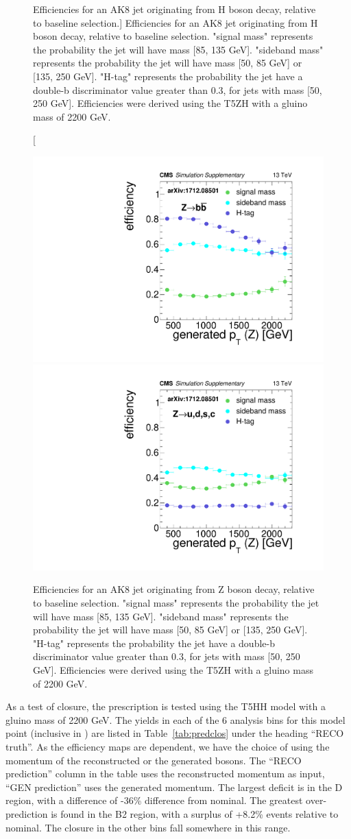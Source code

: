 \begin{figure}
\caption
[Efficiencies for an AK8 jet originating from H boson decay, relative to baseline selection.]
{Efficiencies for an AK8 jet originating from H boson decay, relative to baseline selection. "signal mass" represents the probability the jet will have mass [85, 135 GeV]. "sideband mass" represents the probability the jet will have mass [50, 85 GeV] or [135, 250 GeV]. "H-tag" represents the probability the jet have a double-b discriminator value greater than 0.3, for jets with mass [50, 250 GeV]. Efficiencies were derived using the T5ZH  with a gluino mass of 2200 GeV. }
\label{fig:effH}
\end{figure}

\begin{figure}
\centering
\includegraphics[width=0.425\linewidth]{figs/CMS-SUS-17-006_Figure-aux_011.pdf}
\includegraphics[width=0.425\linewidth]{figs/CMS-SUS-17-006_Figure-aux_012.pdf}
\caption[Efficiencies for an AK8 jet originating from Z boson decay, relative to baseline selection.]
{Efficiencies for an AK8 jet originating from Z boson decay, relative to baseline selection. "signal mass" represents the probability the jet will have mass  [85, 135 GeV]. "sideband mass" represents the probability the jet will have mass [50, 85 GeV] or [135, 250 GeV]. "H-tag" represents the probability the jet have a double-b discriminator value greater than 0.3, for jets with mass [50, 250 GeV]. Efficiencies were derived using the T5ZH  with a gluino mass of 2200 GeV.
}
\label{fig:effZ}
\end{figure}

As a test of closure, the prescription is tested using the T5HH model with a gluino mass of 2200 GeV. The yields in each of the 6 analysis bins for this model point (inclusive in \ptmiss) are listed in Table~\ref{tab:predclos} under the heading ``RECO truth''. As the efficiency maps are \pt dependent, we have the choice of using the momentum of the reconstructed or the generated bosons. The ``RECO prediction'' column in the table uses the reconstructed momentum as input, ``GEN prediction'' uses the generated momentum. The largest deficit is in the D region, with a difference of -36\% difference from nominal. The greatest over-prediction is found in the B2 region, with a surplus of +8.2\% events relative to nominal. The closure in the other bins fall somewhere in this range.


